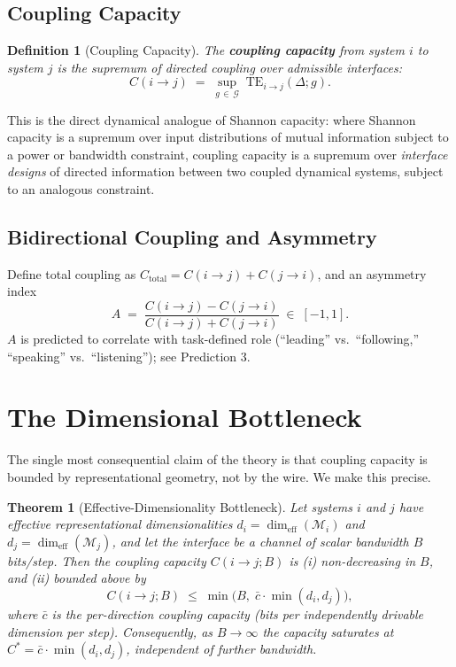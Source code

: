 \documentclass[11pt]{article}
\newtheorem{definitionbox}{Definition}
\newtheorem{theorem}{Theorem}
\begin{document}
\subsection{Coupling Capacity}
\begin{definitionbox}[Coupling Capacity]
The \textbf{coupling capacity} from system $i$ to system $j$ is the supremum of directed coupling over admissible interfaces:
\begin{equation}
C(i \to j) \;=\; \sup_{g \,\in\, \mathcal{G}} \; \mathrm{TE}_{i \to j}(\Delta; g).
\end{equation}
\end{definitionbox}
\noindent This is the direct dynamical analogue of Shannon capacity: where Shannon capacity is a supremum over input distributions of mutual information subject to a power or bandwidth constraint, coupling capacity is a supremum over \emph{interface designs} of directed information between two coupled dynamical systems, subject to an analogous constraint.

\subsection{Bidirectional Coupling and Asymmetry}
Define total coupling as $C_{\text{total}} = C(i \to j) + C(j \to i)$, and an asymmetry index
\begin{equation}
A \;=\; \frac{C(i \to j) - C(j \to i)}{C(i \to j) + C(j \to i)} \;\in\; [-1, 1].
\end{equation}
$A$ is predicted to correlate with task-defined role (``leading'' vs.\ ``following,'' ``speaking'' vs.\ ``listening''); see Prediction 3.

\section{The Dimensional Bottleneck}
\label{sec:proof}

The single most consequential claim of the theory is that coupling capacity is bounded by representational geometry, not by the wire. We make this precise.

\begin{theorem}[Effective-Dimensionality Bottleneck]
Let systems $i$ and $j$ have effective representational dimensionalities $d_i = \dim_{\mathrm{eff}}(\mathcal{M}_i)$ and $d_j = \dim_{\mathrm{eff}}(\mathcal{M}_j)$, and let the interface be a channel of scalar bandwidth $B$ bits/step. Then the coupling capacity $C(i\!\to\!j;B)$ is (i) non-decreasing in $B$, and (ii) bounded above by
\begin{equation}
C(i \to j; B) \;\le\; \min\!\big(B,\; \bar{c}\cdot\min(d_i, d_j)\big),
\end{equation}
where $\bar{c}$ is the per-direction coupling capacity (bits per independently drivable dimension per step). Consequently, as $B \to \infty$ the capacity saturates at $C^\ast = \bar{c}\cdot\min(d_i, d_j)$, independent of further bandwidth.
\end{theorem}
\end{document}
